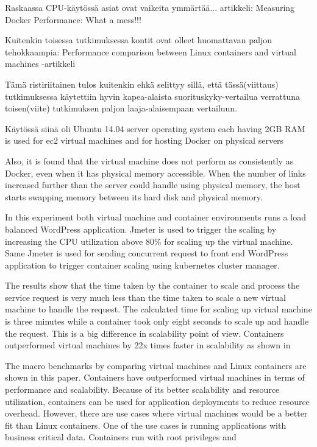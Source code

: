 \documentclass[finnish]{tktltiki2}
\theoremstyle{definition}
\theoremstyle{remark}
\begin{document}
Raskaassa CPU-käytössä asiat ovat vaikeita ymmärtää... artikkeli: Measuring Docker Performance: What a mess!!! \cite{docker-performance}

Kuitenkin toisessa tutkimuksessa kontit ovat olleet huomattavan paljon tehokkaampia: Performance comparison between Linux containers and virtual machines -artikkeli \cite{containers-vs-vms}

Tämä ristiriitainen tulos kuitenkin ehkä selittyy sillä, että tässä(viittaus) tutkimuksessa käytettiin hyvin kapea-alaista suorituskyky-vertailua verrattuna toisen(viite) tutkimuksen paljon laaja-alaisempaan vertailuun.

Käytössä siinä oli Ubuntu 14.04 server operating system each having 2GB RAM is used for ec2 virtual machines and for hosting Docker on physical servers

Also, it is found that the virtual machine does not perform as consistently as Docker, even when it has physical memory accessible. When the number of links increased further than the server could handle using physical memory, the host starts swapping memory between its hard disk and physical memory.

In this experiment both virtual machine and container environments runs a load balanced WordPress application. Jmeter is used to trigger the scaling by increasing the CPU utilization above 80\% for scaling up the virtual machine. Same Jmeter is used for sending concurrent request to front end WordPress application to trigger container scaling using kubernetes cluster manager.

The results show that the time taken by the container to scale and process the service request is very much less than the time taken to scale a new virtual machine to handle the request. The calculated time for scaling up virtual machine is three minutes while a container took only eight seconds to scale up and handle the request. This is a big difference in scalability point of view. Containers outperformed virtual machines by 22x times faster in scalability as shown in

The macro benchmarks by comparing virtual machines and Linux containers are shown in this paper. Containers have outperformed virtual machines in terms of performance and scalability. Because of its better scalability and resource utilization, containers can be used for application deployments to reduce resource overhead. However, there are use cases where virtual machines would be a better fit than Linux containers. One of the use cases is running applications with business critical data. Containers run with root privileges and
\end{document}
